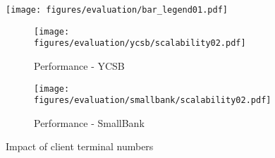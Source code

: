 \begin{figure}[t]
    \centering
    \begin{minipage}{0.8\linewidth}
        \centering
        \texttt{[image: figures/evaluation/bar\_legend01.pdf]}
        \vspace{-5mm}
    \end{minipage}
    \begin{minipage}{0.95\linewidth}
        \centering
        \begin{subfigure}{0.47\linewidth}
            \texttt{[image: figures/evaluation/ycsb/scalability02.pdf]}
            \vspace{-6mm}
            \caption{Performance - YCSB}
            \label{fig:ycsb.sca.per}
        \end{subfigure}
        \begin{subfigure}{0.47\linewidth}
            \texttt{[image: figures/evaluation/smallbank/scalability02.pdf]}
            \vspace{-6mm}
            \caption{Performance - SmallBank}
            \label{fig:sb.sca.per}
        \end{subfigure}
    \end{minipage}
    \vspace{-4mm}
    \caption{Impact of client terminal numbers}
    \label{fig:evaluation.scalability}
    \vspace{-6mm}
\end{figure}

